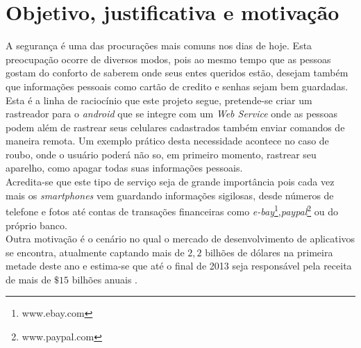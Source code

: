 \section{Objetivo, justificativa e motivação}
A segurança é uma das procurações mais comuns nos dias de hoje. Esta preocupação ocorre de diversos
modos, pois ao mesmo tempo que as pessoas gostam do conforto de saberem onde seus entes queridos 
estão, desejam também que informações pessoais como cartão de credito e senhas sejam bem guardadas.
Esta é a linha de raciocínio que este projeto segue, pretende-se criar um rastreador para o
\emph{android} que se integre com um \emph{Web Service} onde as pessoas podem além de rastrear seus
celulares cadastrados também enviar comandos de maneira remota. Um exemplo prático desta
necessidade acontece no caso de roubo, onde o usuário poderá  não so, em primeiro momento,
rastrear seu aparelho, como apagar todas suas informações pessoais.\\

Acredita-se que este tipo de serviço seja de grande importância pois cada vez mais os
\emph{smartphones} vem guardando informações sigilosas, desde números de telefone e fotos até contas de
transações financeiras como
\emph{e-bay}\footnote{www.ebay.com},\emph{paypal}\footnote{www.paypal.com} ou do próprio banco.\\

Outra motivação é o cenário no qual o mercado de desenvolvimento de aplicativos se encontra,
atualmente captando mais de $2,2$ bilhões de dólares na primeira metade deste ano \cite{r2g-half} e
estima-se que até o final de 2013 seja responsável pela receita de mais de $\$15$ bilhões anuais \cite{r2g}.
